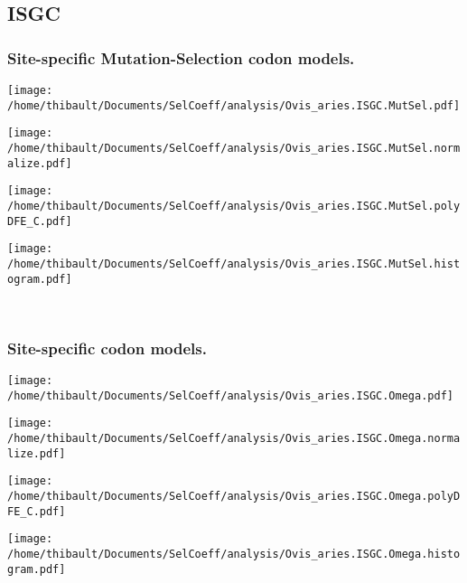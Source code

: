 \subsection{ISGC} 
 
\subsubsection*{Site-specific Mutation-Selection codon models.} 
\begin{minipage}{0.49\linewidth} 
\texttt{[image: /home/thibault/Documents/SelCoeff/analysis/Ovis\_aries.ISGC.MutSel.pdf]} 
\end{minipage}
\begin{minipage}{0.49\linewidth} 
\texttt{[image: /home/thibault/Documents/SelCoeff/analysis/Ovis\_aries.ISGC.MutSel.normalize.pdf]} 
\end{minipage}
\begin{minipage}{0.49\linewidth} 
\texttt{[image: /home/thibault/Documents/SelCoeff/analysis/Ovis\_aries.ISGC.MutSel.polyDFE\_C.pdf]} 
\end{minipage}
\begin{minipage}{0.49\linewidth} 
\texttt{[image: /home/thibault/Documents/SelCoeff/analysis/Ovis\_aries.ISGC.MutSel.histogram.pdf]} 
\end{minipage}
\\ 
\subsubsection*{Site-specific codon models.} 
\begin{minipage}{0.49\linewidth} 
\texttt{[image: /home/thibault/Documents/SelCoeff/analysis/Ovis\_aries.ISGC.Omega.pdf]} 
\end{minipage}
\begin{minipage}{0.49\linewidth} 
\texttt{[image: /home/thibault/Documents/SelCoeff/analysis/Ovis\_aries.ISGC.Omega.normalize.pdf]} 
\end{minipage}
\begin{minipage}{0.49\linewidth} 
\texttt{[image: /home/thibault/Documents/SelCoeff/analysis/Ovis\_aries.ISGC.Omega.polyDFE\_C.pdf]} 
\end{minipage}
\begin{minipage}{0.49\linewidth} 
\texttt{[image: /home/thibault/Documents/SelCoeff/analysis/Ovis\_aries.ISGC.Omega.histogram.pdf]} 
\end{minipage}
\\ 
